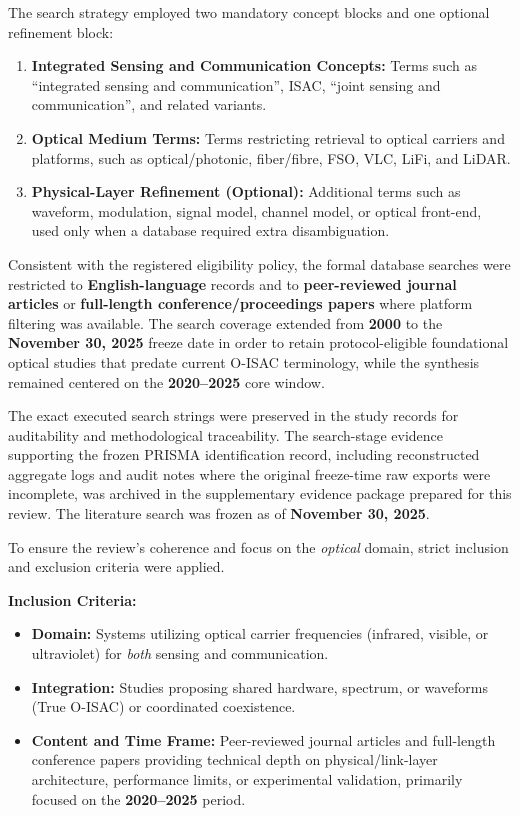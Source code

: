 \documentclass[letterpaper,journal]{IEEEtran}
\begin{document}
The search strategy employed two mandatory concept blocks and one optional refinement block:
\begin{enumerate}
    \item \textbf{Integrated Sensing and Communication Concepts:} Terms such as ``integrated sensing and communication'', ISAC, ``joint sensing and communication'', and related variants.
    \item \textbf{Optical Medium Terms:} Terms restricting retrieval to optical carriers and platforms, such as optical/photonic, fiber/fibre, FSO, VLC, LiFi, and LiDAR.
    \item \textbf{Physical-Layer Refinement (Optional):} Additional terms such as waveform, modulation, signal model, channel model, or optical front-end, used only when a database required extra disambiguation.
\end{enumerate}

Consistent with the registered eligibility policy, the formal database searches were restricted to \textbf{English-language} records and to \textbf{peer-reviewed journal articles} or \textbf{full-length conference/proceedings papers} where platform filtering was available. The search coverage extended from \textbf{2000} to the \textbf{November 30, 2025} freeze date in order to retain protocol-eligible foundational optical studies that predate current O-ISAC terminology, while the synthesis remained centered on the \textbf{2020--2025} core window.

The exact executed search strings were preserved in the study records for auditability and methodological traceability. The search-stage evidence supporting the frozen PRISMA identification record, including reconstructed aggregate logs and audit notes where the original freeze-time raw exports were incomplete, was archived in the supplementary evidence package prepared for this review. The literature search was frozen as of \textbf{November 30, 2025}.

To ensure the review's coherence and focus on the \textit{optical} domain, strict inclusion and exclusion criteria were applied.

\textbf{Inclusion Criteria:}
\begin{itemize}
    \item \textbf{Domain:} Systems utilizing optical carrier frequencies (infrared, visible, or ultraviolet) for \textit{both} sensing and communication.
    \item \textbf{Integration:} Studies proposing shared hardware, spectrum, or waveforms (True O-ISAC) or coordinated coexistence.
    \item \textbf{Content and Time Frame:} Peer-reviewed journal articles and full-length conference papers providing technical depth on physical/link-layer architecture, performance limits, or experimental validation, primarily focused on the \textbf{2020--2025} period.
\end{itemize}
\end{document}
